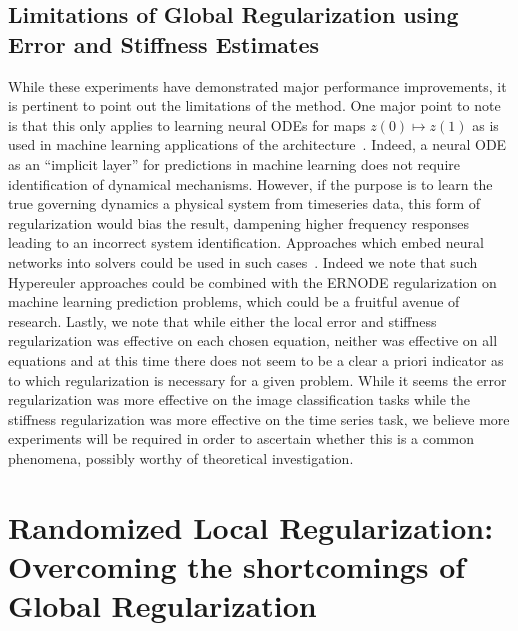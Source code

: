 \subsection{Limitations of Global Regularization using Error and Stiffness Estimates}
\label{subsec:limitations_of_using_error_and_stiffness_estimates}

While these experiments have demonstrated major performance improvements, it is pertinent to point out the limitations of the method. One major point to note is that this only applies to learning neural ODEs for maps $z(0) \mapsto z(1)$ as is used in machine learning applications of the architecture~\citep{chen2018neural}. Indeed, a neural ODE as an ``implicit layer'' for predictions in machine learning does not require identification of dynamical mechanisms. However, if the purpose is to learn the true governing dynamics a physical system from timeseries data, this form of regularization would bias the result, dampening higher frequency responses leading to an incorrect system identification. Approaches which embed neural networks into solvers could be used in such cases~\citep{shen2020deep,poli2020hypersolvers}. Indeed we note that such Hypereuler approaches could be combined with the ERNODE regularization on machine learning prediction problems, which could be a fruitful avenue of research. Lastly, we note that while either the local error and stiffness regularization was effective on each chosen equation, neither was effective on all equations and at this time there does not seem to be a clear a priori indicator as to which regularization is necessary for a given problem. While it seems the error regularization was more effective on the image classification tasks while the stiffness regularization was more effective on the time series task, we believe more experiments will be required in order to ascertain whether this is a common phenomena, possibly worthy of theoretical investigation.

\section{Randomized Local Regularization: Overcoming the shortcomings of Global Regularization}
\label{sec:randomized_local_regularization_overcoming_the_shortcomings_of_global_regularization}

